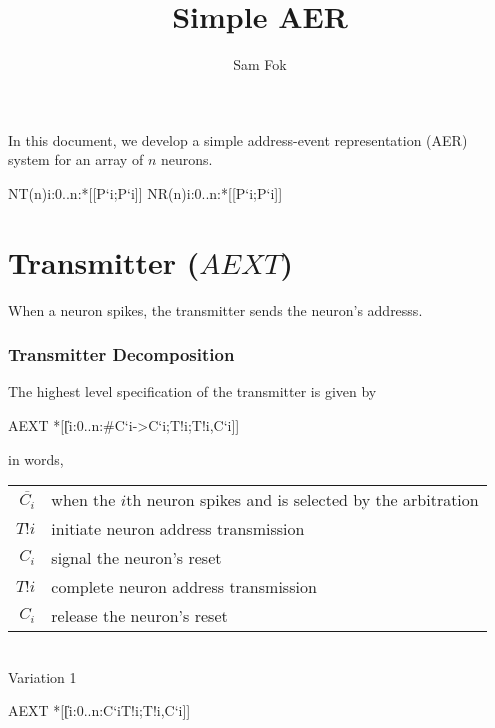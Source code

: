 \documentclass{article}
\begin{document}
\title{Simple AER}
\author{Sam Fok}
\maketitle

In this document, we develop a simple address-event representation (AER) system for an array of $n$ neurons.

\begin{csp}
NT(n)\equiv\langle\pll\!i:0..n:*[[P`i;P`i]]\rangle
NR(n)\equiv\langle\pll\!i:0..n:*[[P`i;P`i]]\rangle
\end{csp}
\part{Transmitter ($AEXT$)}

When a neuron spikes, the transmitter sends the neuron's addresss.

\section{Transmitter Decomposition}

The highest level specification of the transmitter is given by

\begin{csp}
AEXT\equiv
  *[[\langle\|\!i:0..n:#{C`i}->C`i;T!i;T!i,C`i]]
\end{csp}

\noindent in words,

\begin{tabular}[]{rl}
  $\overline{C_i}$ & when the $i$th neuron spikes and is selected by the arbitration \\
  $T!i$ & initiate neuron address transmission \\
  $C_i$ & signal the neuron's reset \\
  $T!i$ & complete neuron address transmission \\
  $C_i$ & release the neuron's reset \\
\end{tabular} \\

\noindent Variation 1

\begin{csp}
AEXT\equiv
  *[[\langle\|\!i:0..n:C`i\star\!T!i;T!i,C`i]]
\end{csp}
\end{document}
